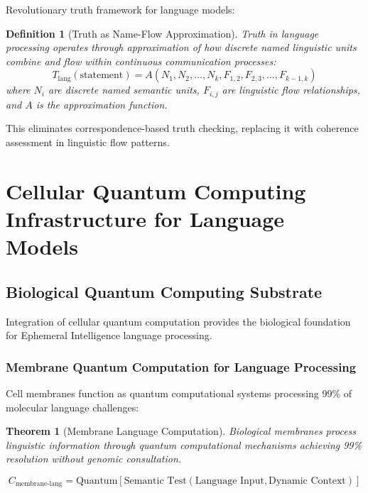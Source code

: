 \documentclass[12pt,a4paper]{article}
\newtheorem{theorem}{Theorem}
\newtheorem{definition}{Definition}
\begin{document}
Revolutionary truth framework for language models:

\begin{definition}[Truth as Name-Flow Approximation]
Truth in language processing operates through approximation of how discrete named linguistic units combine and flow within continuous communication processes:
\begin{equation}
T_{\text{lang}}(\text{statement}) = A(N_1, N_2, \ldots, N_k, F_{1,2}, F_{2,3}, \ldots, F_{k-1,k})
\end{equation}
where $N_i$ are discrete named semantic units, $F_{i,j}$ are linguistic flow relationships, and $A$ is the approximation function.
\end{definition}

This eliminates correspondence-based truth checking, replacing it with coherence assessment in linguistic flow patterns.

\section{Cellular Quantum Computing Infrastructure for Language Models}

\subsection{Biological Quantum Computing Substrate}

Integration of cellular quantum computation provides the biological foundation for Ephemeral Intelligence language processing.

\subsubsection{Membrane Quantum Computation for Language Processing}

Cell membranes function as quantum computational systems processing 99\% of molecular language challenges:

\begin{theorem}[Membrane Language Computation]
Biological membranes process linguistic information through quantum computational mechanisms achieving 99\% resolution without genomic consultation.
\end{theorem}

\begin{equation}
C_{\text{membrane-lang}} = \text{Quantum}[\text{Semantic Test}(\text{Language Input}, \text{Dynamic Context})]
\end{equation}
\end{document}
